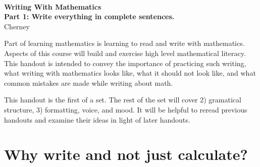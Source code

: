 \documentclass[12pt]{article}
\begin{document}
\thispagestyle{empty}
~
\vspace{-3.9cm}
\begin{center}
{
\Large
 {\bfseries  Writing With Mathematics\\
 Part 1: Write everything in complete sentences.}  \\[10mm]
 {  
 \vspace{-.9cm} 
Cherney}\\[1mm]
\vspace{3.5mm}
}

\end{center}

\setcounter{footnote}{0}
\setcounter{page}{1}

Part of learning mathematics is learning to read and write with mathematics.  
Aspects of this course will build and exercise high level mathematical literacy. 
This handout is intended to convey the importance of practicing such writing,
what writing with mathematics looks like, what it should not look like, and what common mistakes are made while writing about math. 


This handout is the first of a set. The rest of the set will cover 
2) gramatical structure,
3) formatting, voice, and mood.
It will be helpful to reread previous handouts and examine their ideas in light of later handouts.


\section*{Why write and not just calculate?} 
\end{document}

